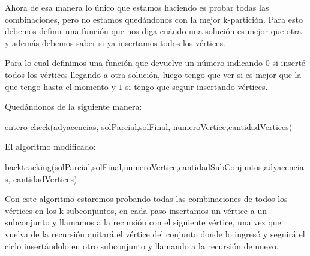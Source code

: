 Ahora de esa manera lo único que estamos haciendo es probar todas las combinaciones, pero no estamos quedándonos con la mejor k-partición. Para esto debemos definir una función que nos diga cuándo una solución es mejor que otra y además debemos saber si ya insertamos todos los vértices.

Para lo cual definimos una función que devuelve un número indicando $0$ si inserté todos los vértices llegando a otra solución, luego tengo que ver si es mejor que la que tengo hasta el momento y $1$ si tengo que seguir insertando vértices.

Quedándonos de la siguiente manera:

\begin{algorithm}
  \begin{algorithmic}[1]\parskip=1mm
 \caption{entero check(adyacencias, solParcial,solFinal, numeroVertice,cantidadVertices)}
  \end{algorithmic}
  \end{algorithm}

El algoritmo modificado: 

\begin{algorithm}
  \begin{algorithmic}[1]\parskip=1mm
 \caption{backtracking(solParcial,solFinal,numeroVertice,cantidadSubConjuntos,adyacencias, cantidadVertices)}

  \end{algorithmic}
  \end{algorithm}

Con este algoritmo estaremos probando todas las combinaciones de todos los vértices en los k subconjuntos, en cada paso insertamos un vértice a un subconjunto y llamamos a la recursión con el siguiente vértice, una vez que vuelva de la recursión quitará el vértice del conjunto donde lo ingresó y seguirá el ciclo insertándolo en otro subconjunto y llamando a la recursión de nuevo.

